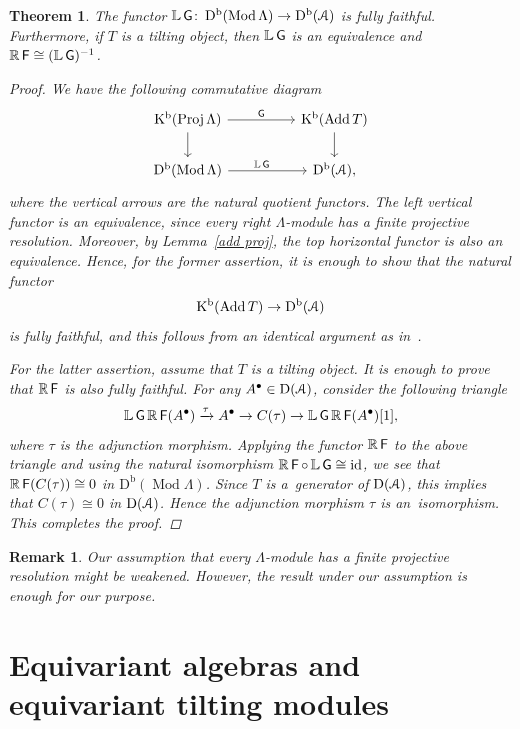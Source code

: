 \documentclass[pdftex]{sigma}%
\newtheorem{rem}[dfn]{Remark}
\newtheorem{thm}[dfn]{Theorem}
\numberwithin{equation}{section}
\newcommand{\Mod}{\operatorname{Mod}}
\newcommand{\Proj}{\operatorname{Proj}}
\newcommand{\Add}{\operatorname{Add}}
\newcommand{\Db}{\operatorname{D^b}}
\newcommand{\D}{\operatorname{D}}
\newcommand{\Kb}{\operatorname{K^b}}
\newcommand{\id}{\operatorname{id}}
\newcommand{\bL}{\mathbb{L}}
\newcommand{\bR}{\mathbb{R}}
\newcommand{\scrA}{\EuScript{A}}
\newcommand{\F}{\operatorname{\sf{F}}}
\newcommand{\G}{\operatorname{\sf{G}}}
\begin{document}
\begin{thm}\label{general tilting}
The functor $\bL \G\colon \Db(\Mod\Lambda)\to\Db(\scrA)$
is fully faithful. Furthermore, if $T$ is a tilting object, then $\bL \G$ is an equivalence and $\bR \F\cong (\bL \G)^{-1}$.
\begin{proof}
 We have the following commutative diagram
\[
\begin{tikzcd}
\Kb(\Proj\Lambda)\arrow[rr,"\G"]\arrow[d,]&&\Kb(\Add T)\arrow[d,]\\
\Db(\Mod\Lambda)\arrow[rr, "\bL \G\,\,\,\,\,\,"]&&\Db(\scrA),
\end{tikzcd}
\]
where the vertical arrows are the natural quotient functors. The left vertical functor is an equi\-va\-lence, since every right $\Lambda$-module has a finite projective resolution. Moreover, by Lemma~\ref{add proj}, the top horizontal functor is also an equivalence. Hence, for the former assertion, it is enough to show that the natural functor
\begin{gather*}
\Kb(\Add T)\to \Db(\scrA)
\end{gather*}
is fully faithful, and this follows from an identical argument as in~\cite[Chapter~III, Lemma~2.1]{happel}.

For the latter assertion, assume that $T$ is a tilting object. It is enough to prove that $\bR \F$ is also fully faithful. For any $A^{\bullet}\in \D(\scrA)$, consider the following triangle
\begin{gather*}
\bL \G \bR \F(A^{\bullet})\xrightarrow{\tau}A^{\bullet}\to C(\tau)\to \bL \G \bR \F(A^{\bullet})[1],
\end{gather*}
where $\tau$ is the adjunction morphism. Applying the functor $\bR \F$ to the above triangle and using the natural isomorphism $\bR \F\circ \,\bL \G\cong \id$, we see that $\bR \F(C(\tau))\cong 0$ in $\Db(\Mod\Lambda)$. Since $T$ is a~generator of $\D(\scrA)$, this implies that $C(\tau)\cong 0$ in $\D(\scrA)$. Hence the adjunction morphism $\tau$ is an~isomorphism. This completes the proof.
\end{proof}
\end{thm}

\begin{rem}
Our assumption that every $\Lambda$-module has a finite projective resolution might be weakened. However, the result under our assumption is enough for our purpose.
\end{rem}

\section{Equivariant algebras and equivariant tilting modules}
\end{document}
